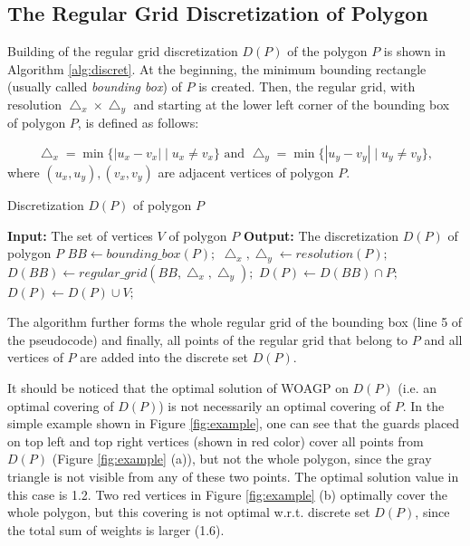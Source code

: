 \documentclass[runningheads,a4paper]{elsarticle}
\begin{document}
	
	\subsection{The Regular Grid Discretization of Polygon}\label{sec:regulardiscretization}
	Building of the regular grid discretization $D(P)$ of the polygon $P$ is shown in Algorithm \ref{alg:discret}.  At the beginning, the minimum bounding rectangle (usually called \textit{bounding box}) of $P$ is created. Then, the  regular grid, with resolution $\bigtriangleup_{x}\times\bigtriangleup_{y}$ and starting at the lower left corner of the bounding box of polygon $P$, is defined as follows:

	\begin{equation}
         \bigtriangleup_{x}=\min\{ |u_{x}-v_{x}|\mid u_{x}\neq v_{x}\} \mbox{ and }
         \bigtriangleup_{y}=\min\{ |u_{y}-v_{y}|\mid u_{y}\neq v_{y}\},
 	\end{equation}
where $ (u_{x},u_{y}),(v_{x},v_{y})$ are adjacent vertices of polygon $P$.
	
	\begin{algorithm}[!t]
		\caption{Discretization $D(P)$ of polygon $P$}\label{alg:discret}
		\begin{algorithmic}[1]
			\State \textbf{Input:} The set of vertices $V$ of polygon $P$
			\State \textbf{Output:} The discretization $D(P)$ of polygon $P$
			\State $BB \gets bounding\_box(P);$
			\State $\bigtriangleup_{x},\bigtriangleup_{y} \gets resolution(P);$
			\State $D(BB) \gets regular\_grid(BB,\bigtriangleup_{x},\bigtriangleup_{y});$
			\State $D(P) \gets D(BB) \cap P;$
			\State $D(P) \gets D(P) \cup V;$
		\end{algorithmic}
	\end{algorithm}
The algorithm further forms the whole regular grid of the bounding box (line 5 of the pseudocode) and finally, all points of the regular grid that belong to $P$ and all vertices of $P$ are added into the discrete set $D(P)$.
	
	It should be noticed that the optimal solution of WOAGP on $D(P)$ (i.e. an optimal covering of $D(P)$) is not necessarily  an optimal covering of $P$. In the simple example shown in Figure \ref{fig:example}, one can see that the guards placed on top left and top right vertices (shown in red color) cover all points from $D(P)$ (Figure \ref{fig:example} (a)), but not the whole polygon, since the gray triangle is not visible from any of these two points. The optimal solution value in this case is 1.2. Two red vertices in Figure \ref{fig:example} (b) optimally cover the whole polygon, but this covering is not optimal w.r.t. discrete set $D(P)$, since the total sum of weights is larger (1.6).
	
\end{document}
